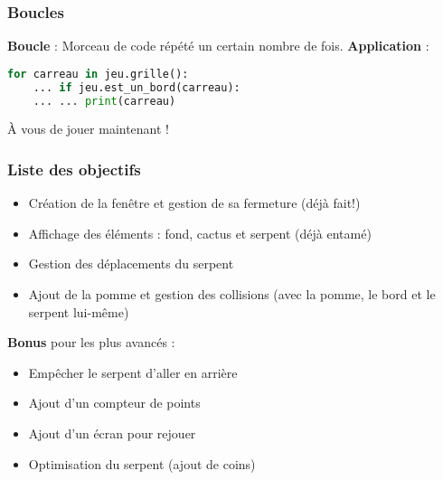 \documentclass{beamer}
\begin{document}
\begin{frame}[fragile]
    \frametitle{Boucles}
    \textbf{Boucle} : Morceau de code répété un certain nombre de fois.
    \medbreak
    \textbf{Application} :
    \begin{lstlisting}[language=python]
    for carreau in jeu.grille():
    ... if jeu.est_un_bord(carreau):
    ... ... print(carreau)
    \end{lstlisting}
    À vous de jouer maintenant !
\end{frame}

\begin{frame}
    \frametitle{Liste des objectifs}
    \begin{itemize}
        \item Création de la fenêtre et gestion de sa fermeture (déjà fait!)
        \item Affichage des éléments : fond, cactus et serpent (déjà entamé)
        \item Gestion des déplacements du serpent
        \item Ajout de la pomme et gestion des collisions (avec la pomme, le bord et le serpent lui-même)
    \end{itemize}
    \textbf{Bonus} pour les plus avancés :
    \begin{itemize}
        \item Empêcher le serpent d'aller en arrière
        \item Ajout d'un compteur de points
        \item Ajout d'un écran pour rejouer
        \item Optimisation du serpent (ajout de coins)
    \end{itemize}
\end{frame}
\end{document}
